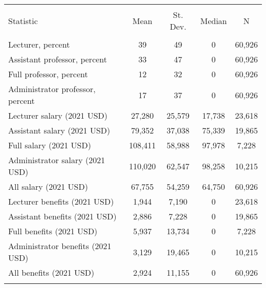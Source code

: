 
\begin{tabular}{@{\extracolsep{5pt}}lcccc} 
\\[-1.8ex]\hline 
\hline \\[-1.8ex] 
Statistic & \multicolumn{1}{c}{Mean} & \multicolumn{1}{c}{St. Dev.} & \multicolumn{1}{c}{Median} & \multicolumn{1}{c}{N} \\ 
\hline \\[-1.8ex] 
Lecturer, percent & 39 & 49 & 0 & 60,926 \\ 
Assistant professor, percent & 33 & 47 & 0 & 60,926 \\ 
Full professor, percent & 12 & 32 & 0 & 60,926 \\ 
Administrator professor, percent & 17 & 37 & 0 & 60,926 \\ 
Lecturer salary (2021 USD) & 27,280 & 25,579 & 17,738 & 23,618 \\ 
Assistant salary (2021 USD) & 79,352 & 37,038 & 75,339 & 19,865 \\ 
Full salary (2021 USD) & 108,411 & 58,988 & 97,978 & 7,228 \\ 
Administrator salary (2021 USD) & 110,020 & 62,547 & 98,258 & 10,215 \\ 
All salary (2021 USD) & 67,755 & 54,259 & 64,750 & 60,926 \\ 
Lecturer benefits (2021 USD) & 1,944 & 7,190 & 0 & 23,618 \\ 
Assistant benefits (2021 USD) & 2,886 & 7,228 & 0 & 19,865 \\ 
Full benefits (2021 USD) & 5,937 & 13,734 & 0 & 7,228 \\ 
Administrator benefits (2021 USD) & 3,129 & 19,465 & 0 & 10,215 \\ 
All benefits (2021 USD) & 2,924 & 11,155 & 0 & 60,926 \\ 
\hline \\[-1.8ex] 
\end{tabular} 
